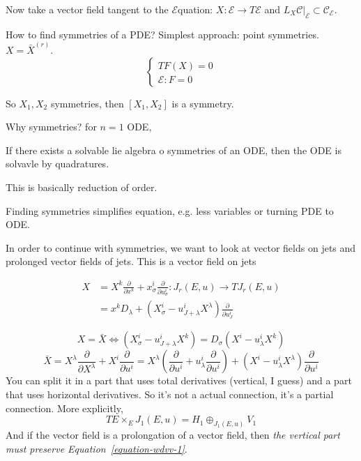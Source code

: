 Now take a vector field tangent to the
$\mathcal{E}$quation: $X: \mathcal{E} \to
T\mathcal{E}$ and
$L_X\mathcal{C}|_{\mathcal{E}}\subset
\mathcal{C}_{\mathcal{E}}$.

How to find symmetries of a PDE? Simplest
approach: point symmetries.
$X=\bar{X}^{(r)}$.
$$
\begin{cases}
TF(X)=0\\
\mathcal{E}:F=0
\end{cases}
$$

So $X_1,X_2$ symmetries, then $[X_1,X_2]$ is
a symmetry.

Why symmetries? for $n=1$ ODE,

\begin{theorem}
\label{theorem-wdvv-lie-bianchi}
If there exists a solvable lie algebra o
symmetries of an ODE, then the ODE is
solvavle by quadratures.
\end{theorem}
This is basically reduction of order.

\medskip{}
Finding symmetries simplifies equation, e.g.
less variables or turning PDE to ODE.

\medskip{}
In order to continue with symmetries, we want
to look at vector fields on jets and
prolonged vector fields of jets. This is a
vector field on jets

$$
\begin{aligned}
X&=X^k \frac{\partial }{\partial
x^k}+x^i_\sigma \frac{\partial }{\partial
u^i_\sigma}:J_r(E,u)\to T J_r(E,u)\\
&=x^kD_\lambda+(X^i_\sigma-u^i_{J
+\lambda}X^\lambda)\frac{\partial }{\partial
u^i_J}
\end{aligned}
$$

\begin{equation}
\label{equation-wdvv-1}
X=\bar{X}\iff
(X^i_\sigma-u^i_{J+\lambda}X^k)=
D_\sigma(X^i-u^i_\lambda
X^k)
\end{equation}
$$
\bar{X}=X^\lambda\frac{\partial }{\partial
X^\lambda}+X^i\frac{\partial }{\partial
u^i}=X^\lambda\left( \frac{\partial
}{\partial u^i} +u^i_\lambda\frac{\partial
}{\partial u^i}\right) +(X^i-u^i_\lambda
X^\lambda)\frac{\partial }{\partial u^i}
$$
You can split it in a part that uses total
derivatives (vertical, I guess) and a part
that uses horizontal derivatives. So it's not
a actual connection, it's a partial
connection. More explicitly,
$$T E \times_E J_1(E,u)=H_1
\oplus_{J_1(E,u)}V_1$$
And if the vector field is a prolongation of
a vector field, then {\it the vertical part
must preserve
Equation~\ref{equation-wdvv-1}}.

